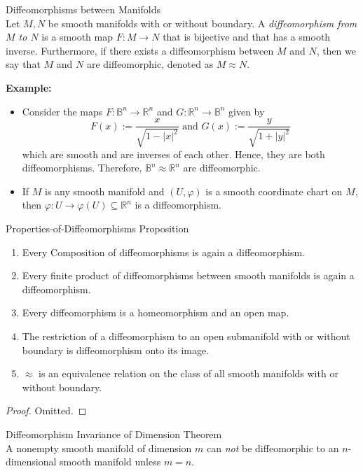 \begin{definition}{Diffeomorphisms between Manifolds}\\
Let $M,N$ be smooth manifolds with or without boundary. A \textit{diffeomorphism from $M$ to $N$} is a smooth map $F:M\to N$ that is bijective and that has a smooth inverse. Furthermore, if there exists a diffeomorphism between $M$ and $N$, then we say that $M$ and $N$ are diffeomorphic, denoted as $M \approx N$.
\end{definition}

\noindent\textbf{Example:} \begin{itemize}
    \item Consider the maps $F: \mathbb{B}^n \to \mathbb{R}^n$ and $G: \mathbb{R}^n \to \mathbb{B}^n$ given by
    \[
    F(x):= \frac{x}{\sqrt{1- |x|^2}} \text{ and } G(x):= \frac{y}{\sqrt{1+ |y|^2}}
    \]
    which are smooth and are inverses of each other. Hence, they are both diffeomorphisms. Therefore, $\mathbb{B}^n \approx \mathbb{R}^n$ are diffeomorphic.

    \item If $M$ is any smooth manifold and $(U,\varphi)$ is a smooth coordinate chart on $M$, then $\varphi:U\to \varphi(U) \subseteq \mathbb{R}^n$ is a diffeomorphism.
\end{itemize}

\begin{proposition}{Properties-of-Diffeomorphisms Proposition}
\begin{enumerate}
    \item Every Composition of diffeomorphisms is again a diffeomorphism.
    \item Every finite product of diffeomorphisms between smooth manifolds is again a diffeomorphism.
    \item Every diffeomorphism is a homeomorphism and an open map.
    \item The restriction of a diffeomorphism to an open submanifold with or without boundary is diffeomorphism onto its image.
    \item $\approx$ is an equivalence relation on the class of all smooth manifolds with or without boundary.
\end{enumerate}
\end{proposition}

\begin{proof}
    Omitted.
\end{proof}

\begin{theorem}{Diffeomorphism Invariance of Dimension Theorem}\\
A nonempty smooth manifold of dimension $m$ can \textit{not} be diffeomorphic to an $n$-dimensional smooth manifold unless $m=n$.
\end{theorem}


